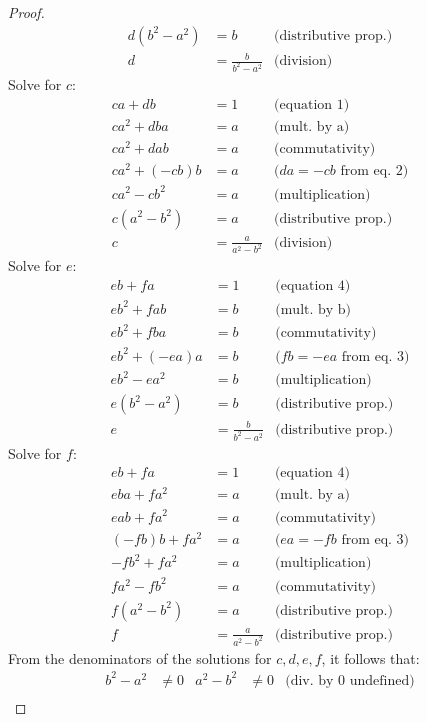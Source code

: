 \documentclass[12pt,reqno]{article}
\theoremstyle{definition}
\begin{document}
\begin{proof}
\begin{align*}
        d(b^2-a^2)&=b &\text{(distributive prop.)}\\
        d&=\frac{b}{b^2-a^2} &\text{(division)}
    \end{align*}
    Solve for $c$:
    \begin{align*}
        ca+db&=1 & \text{(equation 1)}\\
        ca^2+dba&=a & \text{(mult. by a)}\\
        ca^2+dab&=a & \text{(commutativity)}\\
        ca^2+(-cb)b&=a & \text{($da=-cb$ from eq. 2)}\\
        ca^2-cb^2&=a & \text{(multiplication)}\\
        c(a^2-b^2)&=a & \text{(distributive prop.)}\\
        c&=\frac{a}{a^2-b^2} & \text{(division)}
    \end{align*}
    Solve for $e$:
    \begin{align*}
        eb+fa&=1 & \text{(equation 4)}\\
        eb^2+fab&=b & \text{(mult. by b)}\\
        eb^2+fba&=b & \text{(commutativity)}\\
        eb^2+(-ea)a&=b & \text{($fb=-ea$ from eq. 3)}\\
        eb^2-ea^2&=b & \text{(multiplication)}\\
        e(b^2-a^2)&=b & \text{(distributive prop.)}\\
        e&=\frac{b}{b^2-a^2} & \text{(distributive prop.)}
    \end{align*}
    Solve for $f$:
    \begin{align*}
        eb+fa&=1 &\text{(equation 4)}\\
        eba+fa^2&=a &\text{(mult. by a)}\\
        eab+fa^2&=a &\text{(commutativity)}\\
        (-fb)b+fa^2&=a &\text{($ea=-fb$ from eq. 3)}\\
        -fb^2+fa^2&=a &\text{(multiplication)}\\
        fa^2-fb^2&=a &\text{(commutativity)}\\
        f(a^2-b^2)&=a &\text{(distributive prop.)}\\
        f&=\frac{a}{a^2-b^2} &\text{(distributive prop.)}
    \end{align*}
    From the denominators of the solutions for $c,d,e,f$, it follows that:
    \begin{align*}
        b^2-a^2&\neq0 & a^2-b^2&\neq0 & \text{(div. by $0$ undefined)}\\

\end{align*}
\end{proof}
\end{document}
